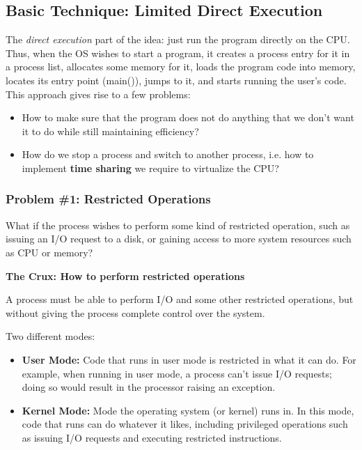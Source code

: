 \subsection{Basic Technique: Limited Direct Execution}

The \textit{direct execution} part of the idea: just run the program directly
on the CPU. Thus, when the OS wishes to start a program, it creates a process
entry for it in a process list, allocates some memory for it, loads the program
code into memory, locates its entry point (main()), jumps to it, and starts
running the user's code.\\

This approach gives rise to a few problems:

\begin{itemize}
    \item How to make sure that the program does not do anything that we don't
        want it to do while still maintaining efficiency?
    \item How do we stop a process and switch to another process, i.e. how
        to implement \textbf{time sharing} we require to virtualize the CPU?
\end{itemize}

\subsubsection{Problem \#1: Restricted Operations}

What if the process wishes to perform some kind of restricted operation, such
as issuing an I/O request to a disk, or gaining access to more system resources
such as CPU or memory?\\

\begin{tcolorbox}
    \textbf{The Crux: How to perform restricted operations}

    A process must be able
    to perform I/O and some other restricted operations, but without giving the
    process complete control over the system.\\
\end{tcolorbox}

Two different modes:

\begin{itemize}
    \item \textbf{User Mode:} Code that runs in user mode is restricted in what
        it can do. For example, when running in user mode, a process can't
        issue I/O requests; doing so would result in the processor raising an
        exception.
    \item \textbf{Kernel Mode:} Mode the operating system (or kernel) runs in.
        In this mode, code that runs can do whatever it likes, including
        privileged operations such as issuing I/O requests and executing
        restricted instructions.
\end{itemize}

